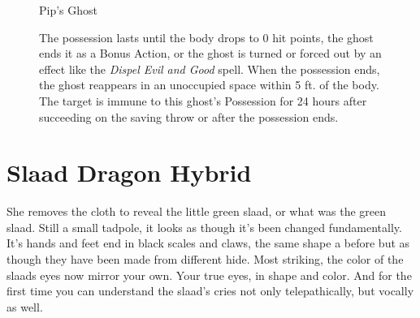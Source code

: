 \begin{figure}[b!]
\begin{monsterbox}{Pip’s Ghost}
\begin{multicols}{2}
\begin{monsteraction}
    \par The possession lasts until the body drops to 0 hit points, the ghost ends it as a Bonus Action, or the ghost is turned or forced out by an effect like the \textit{Dispel Evil and Good} spell. When the possession ends, the ghost reappears in an unoccupied space within 5 ft. of the body. The target is immune to this ghost's Possession for 24 hours after succeeding on the saving throw or after the possession ends.
  \end{monsteraction}
  \end{multicols}
\end{monsterbox}


\end{figure}

\twocolumn

\section{Slaad Dragon Hybrid}

\begin{quotebox}
	{She removes the cloth to reveal the little green slaad, or what was the green slaad. Still a small tadpole, it looks as though it’s been changed fundamentally. It’s hands and feet end in black scales and claws, the same shape a before but as though they have been made from different hide. Most striking, the color of the slaads eyes now mirror your own. Your true eyes, in shape and color. And for the first time you can understand the slaad’s cries not only telepathically, but vocally as well.}{}
\end{quotebox}
